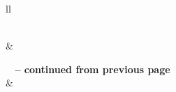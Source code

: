 \documentclass[12pt,letterpaper]{article}
\begin{document}
\begin{center}
\begin{longtable}{ll}
\caption[Species featured on Planet Earth 2 with associated search terms and IUCN status]
{Species featured on Planet Earth 2 with associated search terms and IUCN status} \label{Species} \\

\hline {} &  \\ \hline 
\endfirsthead


%
{{\bfseries \tablename\ \thetable{} -- continued from previous page}} \\
\hline {} &
  \\ \hline 
\endhead

\hline {} \\ \hline
\endfoot

\hline \hline
\endlastfoot


\end{longtable}
\end{center}
\end{document}

